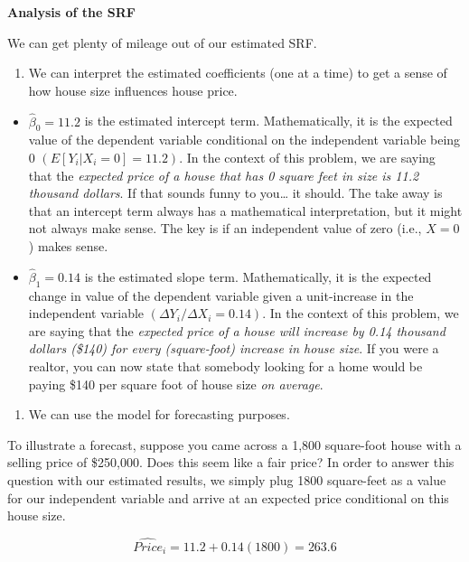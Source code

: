 \documentclass[
]{book}
\providecommand{\tightlist}{%
  \setlength{\itemsep}{0pt}\setlength{\parskip}{0pt}}
\begin{document}
\textbf{Analysis of the SRF}

We can get plenty of mileage out of our estimated SRF.

\begin{enumerate}
\def\labelenumi{\arabic{enumi}.}
\tightlist
\item
  We can interpret the estimated coefficients (one at a time) to get a sense of how house size influences house price.
\end{enumerate}

\begin{itemize}
\item
  \(\hat{\beta}_0=11.2\) is the estimated intercept term. Mathematically, it is the expected value of the dependent variable conditional on the independent variable being 0 \((E[Y_i|X_i=0]=11.2)\). In the context of this problem, we are saying that the \emph{expected price of a house that has 0 square feet in size is 11.2 thousand dollars}. If that sounds funny to you\ldots{} it should. The take away is that an intercept term always has a mathematical interpretation, but it might not always make sense. The key is if an independent value of zero (i.e., \(X=0\)) makes sense.
\item
  \(\hat{\beta}_1=0.14\) is the estimated slope term. Mathematically, it is the expected change in value of the dependent variable given a unit-increase in the independent variable \((\Delta Y_i/\Delta X_i=0.14)\). In the context of this problem, we are saying that the \emph{expected price of a house will increase by 0.14 thousand dollars (\$140) for every (square-foot) increase in house size}. If you were a realtor, you can now state that somebody looking for a home would be paying \$140 per square foot of house size \emph{on average}.
\end{itemize}

\begin{enumerate}
\def\labelenumi{\arabic{enumi}.}
\setcounter{enumi}{1}
\tightlist
\item
  We can use the model for forecasting purposes.
\end{enumerate}

To illustrate a forecast, suppose you came across a 1,800 square-foot house with a selling price of \$250,000. Does this seem like a fair price? In order to answer this question with our estimated results, we simply plug 1800 square-feet as a value for our independent variable and arrive at an expected price conditional on this house size.

\[\hat{Price}_i=11.2+0.14(1800)=263.6\]
\end{document}
